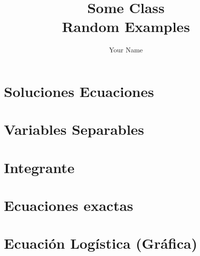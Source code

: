 \documentclass{report}
\title{\Huge{Some Class}\\Random Examples}
\author{\huge{Your Name}}
\date{}
\begin{document}
\maketitle
\newpage%
\tableofcontents
\pagebreak

\chapter{Soluciones Ecuaciones}





\chapter{Variables Separables}





\chapter{Integrante}






\chapter{Ecuaciones exactas}






\chapter{Ecuación Logística (Gráfica)}
\end{document}
